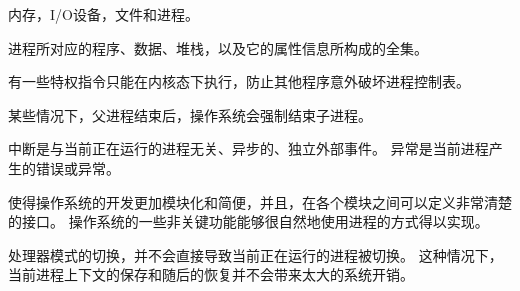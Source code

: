 {    %
    \begin{reviewc}
        内存，I/O设备，文件和进程。
    \end{reviewc}

    \begin{practicec}
        进程所对应的程序、数据、堆栈，以及它的属性信息所构成的全集。
    \end{practicec}

    \begin{reviewc}
        有一些特权指令只能在内核态下执行，防止其他程序意外破坏进程控制表。
    \end{reviewc}

    \begin{reviewc}
        某些情况下，父进程结束后，操作系统会强制结束子进程。
    \end{reviewc}

    \begin{reviewc}
        中断是与当前正在运行的进程无关、异步的、独立外部事件。
        异常是当前进程产生的错误或异常。
    \end{reviewc}

    \begin{reviewc}
        使得操作系统的开发更加模块化和简便，并且，在各个模块之间可以定义非常清楚的接口。
        操作系统的一些非关键功能能够很自然地使用进程的方式得以实现。
    \end{reviewc}

    \begin{reviewc}
        处理器模式的切换，并不会直接导致当前正在运行的进程被切换。
        这种情况下，当前进程上下文的保存和随后的恢复并不会带来太大的系统开销。
    \end{reviewc}
}
